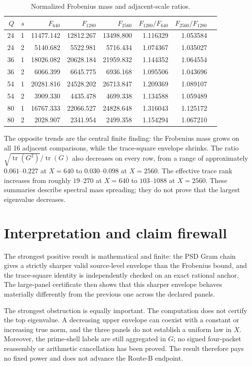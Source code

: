 \documentclass[10pt,a4paper]{article}
\newcommand{\tr}{\operatorname{tr}}
\begin{document}
\begin{table}[t]
\centering
\setlength{\tabcolsep}{3.5pt}
\scriptsize
\caption{Normalized Frobenius mass and adjacent-scale ratios.}
\label{tab:hs}
\begin{tabular}{rrr rrr rr}
\toprule
$Q$ & $s$ & $F_{640}$ & $F_{1280}$ & $F_{2560}$ &
 $F_{1280}/F_{640}$ & $F_{2560}/F_{1280}$\\
\midrule
24&1&11477.142&12812.267&13498.800&1.116329&1.053584\\
24&2&5140.682&5522.981&5716.434&1.074367&1.035027\\
36&1&18026.082&20628.184&21959.832&1.144352&1.064554\\
36&2&6066.399&6645.775&6936.168&1.095506&1.043696\\
54&1&20281.816&24528.202&26713.847&1.209369&1.089107\\
54&2&3909.330&4435.478&4699.338&1.134588&1.059489\\
80&1&16767.333&22066.527&24828.648&1.316043&1.125172\\
80&2&2028.907&2341.954&2499.358&1.154294&1.067210\\
\bottomrule
\end{tabular}
\end{table}

The opposite trends are the central finite finding: the Frobenius mass grows
on all 16 adjacent comparisons, while the trace-square envelope shrinks.  The
ratio $\sqrt{\tr(G^2)}/\tr(G)$ also decreases on every row, from a range of
approximately $0.061$--$0.227$ at $X=640$ to $0.030$--$0.098$ at $X=2560$.
The effective trace rank increases from roughly $19$--$270$ at $X=640$ to
$103$--$1088$ at $X=2560$.  These summaries describe spectral mass spreading;
they do not prove that the largest eigenvalue decreases.

\section{Interpretation and claim firewall}

The strongest positive result is mathematical and finite: the PSD Gram chain
gives a strictly sharper valid source-level envelope than the Frobenius
bound, and the trace-square identity is independently checked on an exact
rational anchor.  The large-panel certificate then shows that this sharper
envelope behaves materially differently from the previous one across the
declared panels.

The strongest obstruction is equally important.  The computation does not
certify the top eigenvalue.  A decreasing upper envelope can coexist with a
constant or increasing true norm, and the three panels do not establish a
uniform law in $X$.  Moreover, the prime-shell labels are still aggregated in
$G$; no signed four-packet reassembly or arithmetic cancellation has been
proved.  The result therefore pays no fixed power and does not advance the
Route-B endpoint.
\end{document}
